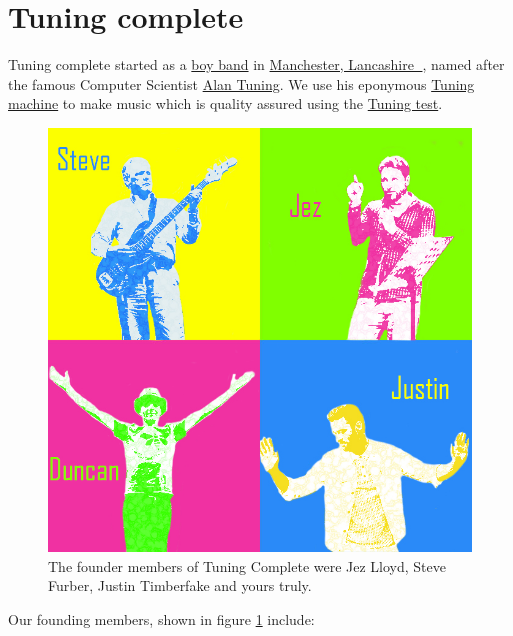 \documentclass[
  12pt,
]{book}
\begin{document}
\hypertarget{tuningcomplete}{%
\section{Tuning complete}\label{tuningcomplete}}

Tuning complete started as a \href{https://en.wikipedia.org/wiki/Boy_band}{boy band} in \href{https://duncan.hull.name/2019/07/05/mancashire/}{Manchester, Lancashire 🌹}, named after the famous Computer Scientist \href{https://en.wikipedia.org/wiki/Alan_Turing}{Alan Tuning}. We use his eponymous \href{https://en.wikipedia.org/wiki/Turing_machine}{Tuning machine} to make music which is quality assured using the \href{https://en.wikipedia.org/wiki/Turing_test}{Tuning test}.

\begin{figure}

{\centering \includegraphics[width=0.7\linewidth]{images/tuning-complete} 

}

\caption{The founder members of Tuning Complete were Jez Lloyd, Steve Furber, Justin Timberfake and yours truly.}\label{fig:beatles-fig}
\end{figure}

Our founding members, shown in figure \ref{fig:beatles-fig} include:
\end{document}
